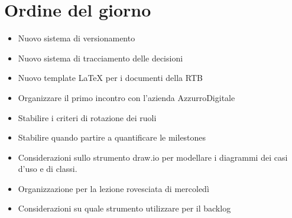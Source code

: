 \section{Ordine del giorno}

\begin{itemize}
    \item Nuovo sistema di versionamento 
    \item Nuovo sistema di tracciamento delle decisioni
    \item Nuovo template LaTeX per i documenti della RTB
    \item Organizzare il primo incontro con l'azienda AzzurroDigitale
    \item Stabilire i criteri di rotazione dei ruoli
    \item Stabilire quando partire a quantificare le milestones
    \item Considerazioni sullo strumento draw.io per modellare i diagrammi dei casi d'uso e di classi.
    \item Organizzazione per la lezione rovesciata di mercoledì 
    \item Considerazioni su quale strumento utilizzare per il backlog
\end{itemize}
